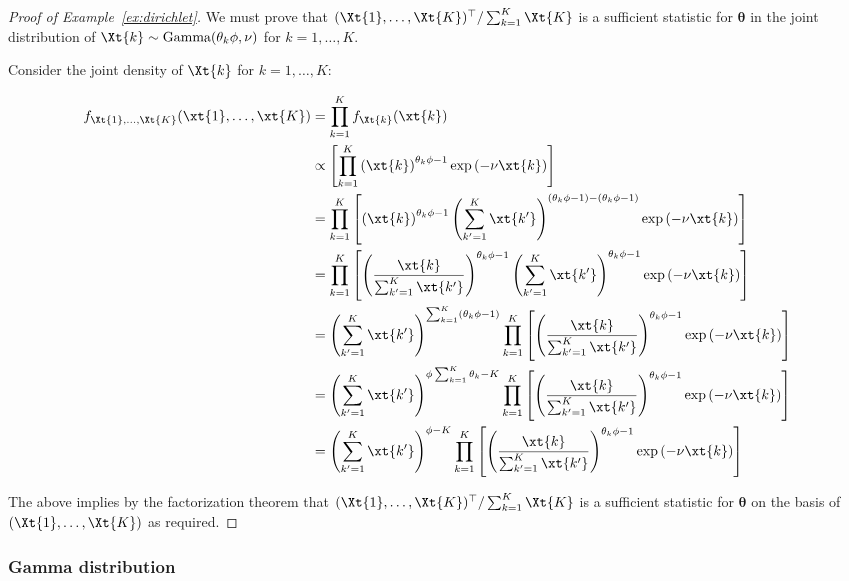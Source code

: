 \documentclass[12pt]{article}
\begin{document}
\begin{proof}[Proof of Example~\ref{ex:dirichlet}]
We must prove that $(\Xt{1},\dots,\Xt{K})^\top/\sum_{k=1}^K\Xt{K}$ is a sufficient statistic for $\boldsymbol\theta$ in the joint distribution of $\Xt{k}\sim\text{Gamma}(\theta_k\phi,\nu)$ for $k=1,\dots,K$.

Consider the joint density of $\Xt{k}$ for $k=1,\dots,K$:

\begin{align*}
f_{\Xt{1},\dots,\Xt{K}}(\xt{1},\dots,\xt{K}) &= \prod_{k=1}^K f_{\Xt{k}}(\xt{k}) \\
&\propto \left[\prod_{k=1}^K \left(\xt{k}\right)^{\theta_k\phi-1}\exp\left(-\nu\xt{k}\right)\right] \\
&= \prod_{k=1}^K \left[\left(\xt{k}\right)^{\theta_k\phi-1}\left(\sum_{k'=1}^K\xt{k'}\right)^{(\theta_k\phi-1)-(\theta_k\phi-1)}\exp\left(-\nu\xt{k}\right)\right] \\
&= \prod_{k=1}^K \left[\left(\frac{\xt{k}}{\sum_{k'=1}^K\xt{k'}}\right)^{\theta_k\phi-1}\left(\sum_{k'=1}^K\xt{k'}\right)^{\theta_k\phi-1}\exp\left(-\nu\xt{k}\right)\right] \\
&= \left(\sum_{k'=1}^K\xt{k'}\right)^{\sum_{k=1}^K(\theta_k\phi-1)}\prod_{k=1}^K \left[\left(\frac{\xt{k}}{\sum_{k'=1}^K\xt{k'}}\right)^{\theta_k\phi-1}\exp\left(-\nu\xt{k}\right)\right] \\
&= \left(\sum_{k'=1}^K\xt{k'}\right)^{\phi\sum_{k=1}^K\theta_k-K}\prod_{k=1}^K \left[\left(\frac{\xt{k}}{\sum_{k'=1}^K\xt{k'}}\right)^{\theta_k\phi-1}\exp\left(-\nu\xt{k}\right)\right] \\
&= \left(\sum_{k'=1}^K\xt{k'}\right)^{\phi-K}\prod_{k=1}^K \left[\left(\frac{\xt{k}}{\sum_{k'=1}^K\xt{k'}}\right)^{\theta_k\phi-1}\exp\left(-\nu\xt{k}\right)\right] \\
\end{align*}

The above implies by the factorization theorem that $(\Xt{1},\dots,\Xt{K})^\top/\sum_{k=1}^K\Xt{K}$ is a sufficient statistic for $\boldsymbol\theta$ on the basis of $(\Xt{1},\dots,\Xt{K})$ as required.
    
\end{proof}

\subsubsection{Gamma distribution}
\label{subsec:gamma-proofs}
\end{document}
